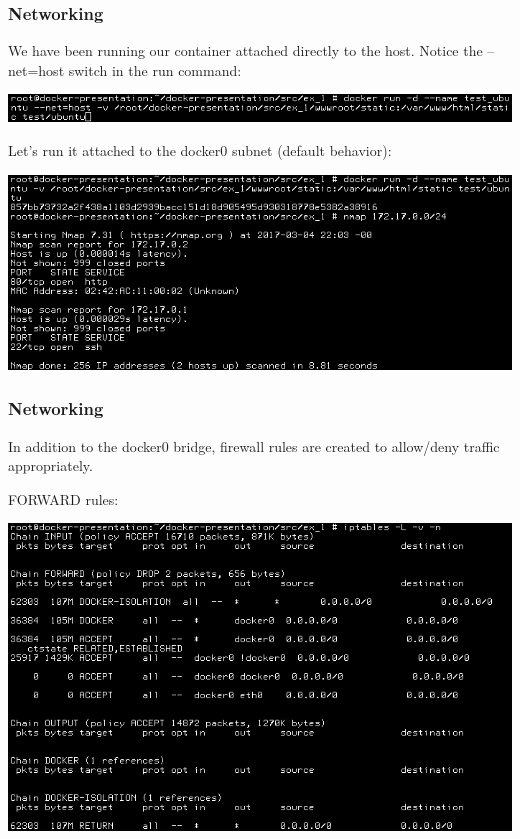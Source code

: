 \documentclass[helvetica,english,utf8,notitle,nologo]{beamer}
\begin{document}
\begin{frame}
  \frametitle{Networking}

  We have been running our container attached directly to the
  host. Notice the --net=host switch in the run command:

  \includegraphics[scale=0.44]{image_18}

  Let's run it attached to the docker0 subnet (default behavior):

  \includegraphics[scale=0.44]{image_25}
\end{frame}

\begin{frame}
  \frametitle{Networking}

  In addition to the docker0 bridge, firewall rules are created to
  allow/deny traffic appropriately.

  FORWARD rules:

  \includegraphics[scale=0.44]{image_26}
\end{frame}
\end{document}
